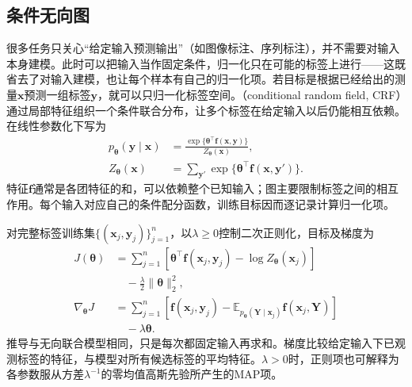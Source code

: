 \subsection{条件无向图}
\label{sec:pgm-parameter-learning-conditional}

很多任务只关心“给定输入预测输出”（如图像标注、序列标注），并不需要对输入本身建模。此时可以把输入当作固定条件，归一化只在可能的标签上进行——这既省去了对输入建模，也让每个样本有自己的归一化项。若目标是根据已经给出的测量$\bm{x}$预测一组标签$\bm{y}$，就可以只归一化标签空间。（conditional random field, CRF）通过局部特征组织一个条件联合分布，让多个标签在给定输入以后仍能相互依赖。在线性参数化下写为
\begin{equation}
  \begin{aligned}
    p_{\bm{\theta}}(\bm{y}\mid\bm{x})
      &=\frac{\exp\{\bm{\theta}^\top\bm{f}(\bm{x},\bm{y})\}}
              {Z_{\bm{\theta}}(\bm{x})},\\
    Z_{\bm{\theta}}(\bm{x})
      &=\sum_{\bm{y}'}
         \exp\{\bm{\theta}^\top\bm{f}(\bm{x},\bm{y}')\}.
  \end{aligned}
  \label{eq:pgm-parameter-learning-crf}
\end{equation}
特征$\bm{f}$通常是各团特征的和，可以依赖整个已知输入；图主要限制标签之间的相互作用。每个输入对应自己的条件配分函数，训练目标因而逐记录计算归一化项。

对完整标签训练集$\{(\bm{x}_j,\bm{y}_j)\}_{j=1}^n$，以$\lambda\geq0$控制二次正则化，目标及梯度为
\begin{equation}
  \begin{aligned}
    J(\bm{\theta})
      &=\sum_{j=1}^n
        \left[\bm{\theta}^\top\bm{f}(\bm{x}_j,\bm{y}_j)
                    -\log Z_{\bm{\theta}}(\bm{x}_j)\right]\\
      &\quad-\frac{\lambda}{2}\lVert\bm{\theta}\rVert_2^2,\\
    \nabla_{\bm{\theta}}J
      &=\sum_{j=1}^n
        \left[\bm{f}(\bm{x}_j,\bm{y}_j)
          -\mathbb{E}_{p_{\bm{\theta}}(\bm{Y}\mid\bm{x}_j)}
             \bm{f}(\bm{x}_j,\bm{Y})\right]\\
      &\quad-\lambda\bm{\theta}.
  \end{aligned}
  \label{eq:pgm-parameter-learning-crf-gradient}
\end{equation}
推导与无向联合模型相同，只是每次都固定输入再求和。梯度比较给定输入下已观测标签的特征，与模型对所有候选标签的平均特征。$\lambda>0$时，正则项也可解释为各参数服从方差$\lambda^{-1}$的零均值高斯先验所产生的MAP项。

